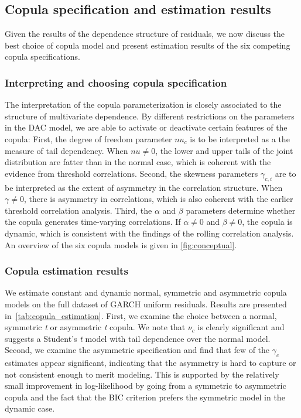 \subsection{Copula specification and estimation results}
Given the results of the dependence structure of residuals, we now discuss the best choice of copula model and present estimation results of the six competing copula specifications.

\subsubsection{Interpreting and choosing copula specification}

The interpretation of the copula parameterization is closely associated to the structure of multivariate dependence. By different restrictions on the parameters in the DAC model, we are able to activate or deactivate certain features of the copula: First, the degree of freedom parameter $nu_c$ is to be interpreted as a the measure of tail dependency. When $nu \neq 0$, the lower and upper tails of the joint distribution are fatter than in the normal case, which is coherent with the evidence from threshold correlations. Second, the skewness parameters $\gamma_{c,i}$ are to be interpreted as the extent of asymmetry in the correlation structure. When $\gamma \neq 0$, there is asymmetry in correlations, which is also coherent with the earlier threshold correlation analysis. Third, the $\alpha$ and $\beta$ parameters determine whether the copula generates time-varying correlations. If $\alpha \neq 0$ and $\beta \neq 0$, the copula is dynamic, which is consistent with the findings of the rolling correlation analysis. An overview of the six copula models is given in \autoref{fig:conceptual}.



\subsubsection{Copula estimation results}

We estimate constant and dynamic normal, symmetric and asymmetric copula models on the full dataset of GARCH uniform residuals. Results are presented in~\autoref{tab:copula_estimation}. First, we examine the choice between a normal, symmetric \textit{t} or asymmetric \textit{t} copula. We note that $\nu_c$ is clearly significant and suggests a Student's \textit{t} model with tail dependence over the normal model. Second, we examine the asymmetric specification and find that few of the $\gamma_c$ estimates appear significant, indicating that the asymmetry is hard to capture or not consistent enough to merit modeling. This is supported by the relatively small improvement in log-likelihood by going from a symmetric to asymmetric copula and the fact that the BIC criterion prefers the symmetric model in the dynamic case. 

